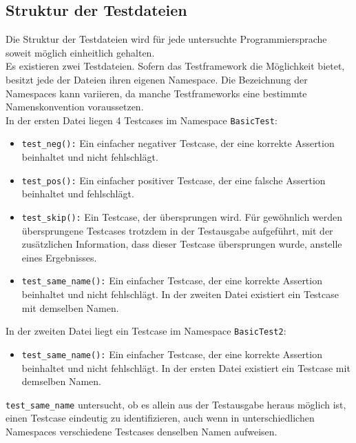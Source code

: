 \subsection{Struktur der Testdateien}
Die Struktur der Testdateien wird für jede untersuchte Programmiersprache soweit möglich einheitlich gehalten.\\
Es existieren zwei Testdateien. Sofern das Testframework die Möglichkeit bietet, besitzt jede der Dateien ihren eigenen Namespace. Die Bezeichnung der Namespaces kann variieren, da manche Testframeworks eine bestimmte Namenskonvention voraussetzen.\\
In der ersten Datei liegen 4 Testcases im Namespace \texttt{BasicTest}:
\begin{itemize}
    \item \texttt{test\_neg():} Ein einfacher negativer Testcase, der eine korrekte Assertion beinhaltet und nicht fehlschlägt.
    \item \texttt{test\_pos():} Ein einfacher positiver Testcase, der eine falsche Assertion beinhaltet und fehlschlägt.
    \item \texttt{test\_skip():} Ein Testcase, der übersprungen wird. Für gewöhnlich werden übersprungene Testcases trotzdem in der Testausgabe aufgeführt, mit der zusätzlichen Information, dass dieser Testcase übersprungen wurde, anstelle eines Ergebnisses. %
    \item \texttt{test\_same\_name():} Ein einfacher Testcase, der eine korrekte Assertion beinhaltet und nicht fehlschlägt. In der zweiten Datei existiert ein Testcase mit demselben Namen.
\end{itemize}
\newpage
In der zweiten Datei liegt ein Testcase im Namespace \texttt{BasicTest2}:
\begin{itemize}
    \item \texttt{test\_same\_name():} Ein einfacher Testcase, der eine korrekte Assertion beinhaltet und nicht fehlschlägt. In der ersten Datei existiert ein Testcase mit demselben Namen.
\end{itemize}
\texttt{test\_same\_name} untersucht, ob es allein aus der Testausgabe heraus möglich ist, einen Testcase eindeutig zu identifizieren, auch wenn in unterschiedlichen Namespaces verschiedene Testcases denselben Namen aufweisen.

